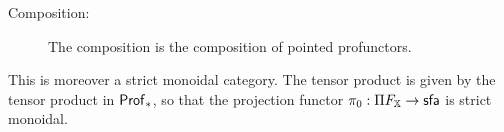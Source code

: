 \begin{lemma}
\begin{description}
%


\item[Composition:] The composition is the composition of pointed profunctors.

\end{description}

This is moreover a strict monoidal category.  The tensor product is given by the tensor product in ${\sf Prof}_*$, so that the projection functor $\pi_0:\Pi F_{\mathbb{X}}\to {\sf sfa}$ is strict monoidal.


\end{lemma}



